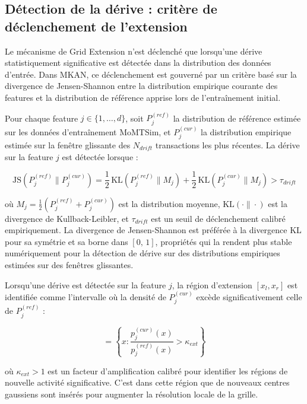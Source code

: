 \documentclass[11pt,a4paper,oneside]{report}
\theoremstyle{definition}
\theoremstyle{remark}
\begin{document}
\subsection{Détection de la dérive : critère de déclenchement de l'extension}

Le mécanisme de Grid Extension n'est déclenché que lorsqu'une dérive statistiquement significative est détectée dans la distribution des données d'entrée. Dans MKAN, ce déclenchement est gouverné par un critère basé sur la divergence de Jensen-Shannon entre la distribution empirique courante des features et la distribution de référence apprise lors de l'entraînement initial.

Pour chaque feature $j \in \{1, \ldots, d\}$, soit $P_j^{(ref)}$ la distribution de référence estimée sur les données d'entraînement MoMTSim, et $P_j^{(cur)}$ la distribution empirique estimée sur la fenêtre glissante des $N_{drift}$ transactions les plus récentes. La dérive sur la feature $j$ est détectée lorsque :

\begin{equation}
    \text{JS}\!\left(P_j^{(ref)} \| P_j^{(cur)}\right)
    = \frac{1}{2}\,\text{KL}\!\left(P_j^{(ref)} \| M_j\right)
    + \frac{1}{2}\,\text{KL}\!\left(P_j^{(cur)} \| M_j\right)
    > \tau_{drift}
\end{equation}

où $M_j = \frac{1}{2}\!\left(P_j^{(ref)} + P_j^{(cur)}\right)$ est la distribution moyenne, $\text{KL}(\cdot \| \cdot)$ est la divergence de Kullback-Leibler, et $\tau_{drift}$ est un seuil de déclenchement calibré empiriquement. La divergence de Jensen-Shannon est préférée à la divergence KL pour sa symétrie et sa borne dans $[0,\, 1]$, propriétés qui la rendent plus stable numériquement pour la détection de dérive sur des distributions empiriques estimées sur des fenêtres glissantes.

Lorsqu'une dérive est détectée sur la feature $j$, la région d'extension $[x_l, x_r]$ est identifiée comme l'intervalle où la densité de $P_j^{(cur)}$ excède significativement celle de $P_j^{(ref)}$ :

\begin{equation}
    [x_l, x_r] = \left\{x : \frac{p_j^{(cur)}(x)}{p_j^{(ref)}(x)} > \kappa_{ext}\right\}
\end{equation}

où $\kappa_{ext} > 1$ est un facteur d'amplification calibré pour identifier les régions de nouvelle activité significative. C'est dans cette région que de nouveaux centres gaussiens sont insérés pour augmenter la résolution locale de la grille.
\end{document}

